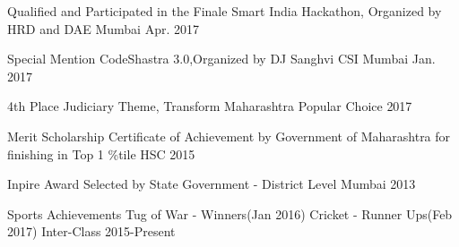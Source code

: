 



\begin{cvhonors}

  \cvhonor
    {Qualified and Participated in the Finale} %
    {Smart India Hackathon, Organized by HRD and DAE} %
    {Mumbai} %
    {Apr. 2017} %

  \cvhonor
    {Special Mention} %
    {CodeShastra 3.0,Organized by DJ Sanghvi CSI} %
    {Mumbai} %
    {Jan. 2017} %

  \cvhonor
    {4th Place} %
    {Judiciary Theme, Transform Maharashtra} %
    {Popular Choice} %
    {2017} %

  \cvhonor
    {Merit Scholarship} %
    {Certificate of Achievement by Government of Maharashtra for finishing in Top 1 \%tile} %
    {HSC} %
    {2015} %

  \cvhonor
    {Inpire Award} %
    {Selected by State Government - District Level} %
    {Mumbai} %
    {2013} %

  \cvhonor
    {Sports Achievements} %
    {Tug of War - Winners(Jan 2016)  Cricket - Runner Ups(Feb 2017)} %
    {Inter-Class} %
    {2015-Present} %
\end{cvhonors}




